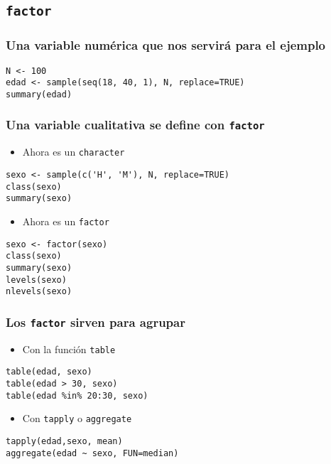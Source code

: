 \documentclass{beamer}
\begin{document}
\subsection{\texttt{factor}}
\label{sec-4-1}
\begin{frame}[fragile]
\frametitle{Una variable numérica que nos servirá para el ejemplo}
\label{sec-4-1-1}


\lstset{language=R}
\begin{lstlisting}
N <- 100
edad <- sample(seq(18, 40, 1), N, replace=TRUE)
summary(edad)
\end{lstlisting}
\end{frame}
\begin{frame}[fragile]
\frametitle{Una variable cualitativa se define con \texttt{factor}}
\label{sec-4-1-2}

\begin{itemize}
\item Ahora es un \texttt{character}
\end{itemize}

\lstset{language=R}
\begin{lstlisting}
sexo <- sample(c('H', 'M'), N, replace=TRUE)
class(sexo)
summary(sexo)
\end{lstlisting}
\begin{itemize}
\item Ahora es un \texttt{factor}
\end{itemize}

\lstset{language=R}
\begin{lstlisting}
sexo <- factor(sexo)
class(sexo)
summary(sexo)
levels(sexo)
nlevels(sexo)
\end{lstlisting}
\end{frame}
\begin{frame}[fragile]
\frametitle{Los \texttt{factor} sirven para agrupar}
\label{sec-4-1-3}


\begin{itemize}
\item Con la función \texttt{table}
\end{itemize}

\lstset{language=R}
\begin{lstlisting}
table(edad, sexo)
table(edad > 30, sexo)
table(edad %in% 20:30, sexo)
\end{lstlisting}

\begin{itemize}
\item Con \texttt{tapply} o \texttt{aggregate}
\end{itemize}

\lstset{language=R}
\begin{lstlisting}
tapply(edad,sexo, mean)
aggregate(edad ~ sexo, FUN=median)
\end{lstlisting}
\end{frame}
\end{document}
